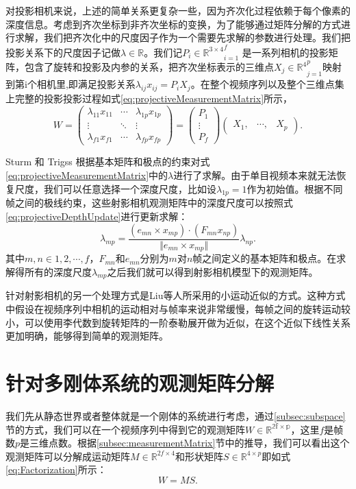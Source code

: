 对投影相机来说，上述的简单关系更复杂一些，因为齐次化过程依赖于每个像素的深度信息\cite{Sturm1996A}。考虑到齐次坐标到非齐次坐标的变换，为了能够通过矩阵分解的方式进行求解，我们把齐次化中的尺度因子作为一个需要先求解的参数进行处理。我们把投影关系下的尺度因子记做$\lambda\in \mathbb{R}$。我们记${P_i\in \mathbb{R}^{3\times4}}_{i=1}^f$ 是一系列相机的投影矩阵，包含了旋转和投影及内参的关系，把齐次坐标表示的三维点${X_j\in \mathbb{R}^4}_{j=1}^p$映射到第i个相机里,即满足投影关系$\lambda_{ij}x_{ij}=P_i X_j$。在整个视频序列以及整个三维点集上完整的投影投影过程如式\eqref{eq:projectiveMeasurementMatrix}所示，
\begin{equation}\label{eq:projectiveMeasurementMatrix}
W=
\begin{pmatrix}
\lambda_{11}x_{11}&\cdots&\lambda_{1p}x_{1p}\\
\vdots&\ddots & \vdots\\
\lambda_{f1}x_{f1}&\cdots&\lambda_{fp}x_{fp}
\end{pmatrix}
=
\begin{pmatrix}
P_1\\
\vdots\\
P_f
\end{pmatrix}
\begin{pmatrix}
X_1,&\cdots,&X_p
\end{pmatrix}.
\end{equation}

Sturm 和 Trigss\cite{Sturm1996A} 根据基本矩阵和极点的约束对式\eqref{eq:projectiveMeasurementMatrix}中的$\lambda$进行了求解。由于单目视频本来就无法恢复尺度，我们可以任意选择一个深度尺度，比如设$\lambda_{1p}=1$作为初始值。根据不同帧之间的极线约束，这些射影相机观测矩阵中的深度尺度可以按照式\eqref{eq:projectiveDepthUpdate}进行更新求解：
\begin{equation}\label{eq:projectiveDepthUpdate}
\lambda_{mp}=\frac{(e_{mn}\times x_{mp})\cdot(F_{mn}x_{np})}{\Vert e_{mn}\times x_{mp}\Vert}\lambda_{np}.
\end{equation} 
其中$m,n\in{1,2,\cdots,f}$，$F_{mn}$和$e_{mn}$分别为$m$对$n$帧之间定义的基本矩阵和极点。在求解得所有的深度尺度$\lambda_{mp}$之后我们就可以得到射影相机模型下的观测矩阵。

针对射影相机的另一个处理方式是Liu等人\cite{Feng2013Joint}所采用的小运动近似的方式。这种方式中假设在视频序列中相机的运动相对与帧率来说非常缓慢，每帧之间的旋转运动较小，可以使用李代数到旋转矩阵的一阶泰勒展开做为近似，在这个近似下线性关系更加明确，能够得到简单的观测矩阵。
\section{针对多刚体系统的观测矩阵分解}
我们先从静态世界或者整体就是一个刚体的系统进行考虑，通过\ref{subsec:subspace}节的方式，我们可以在一个视频序列中得到它的观测矩阵$W\in \mathbb{R^{2f\times p}}$，这里$f$是帧数$p$是三维点数。根据\ref{subsec:measurementMatrix}节中的推导，我们可以看出这个观测矩阵可以分解成运动矩阵$M\in \mathbb{R}^{2f\times 4}$和形状矩阵$S\in\mathbb{R}^{4\times p}$即如式\eqref{eq:Factorization}所示：
\begin{equation}\label{eq:Factorization}
W=M S .
\end{equation}

